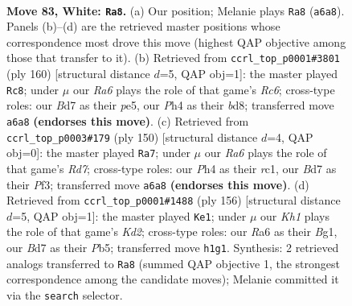 \documentclass[11pt]{article}
\begin{document}
\clearpage

\begin{figure}[p]\centering
\begin{subfigure}{0.46\textwidth}\centering
\resizebox{\linewidth}{!}{%
\newchessgame
\chessboard[
  setfen={8/3B1P2/R7/8/7P/1k6/8/7K w - - 9 83},
  showmover=false,
  pgfstyle=straightmove, color=movearrow, markmove={a6-a8}
]}
\caption{}
\end{subfigure}\hfill
\begin{subfigure}{0.46\textwidth}\centering
\resizebox{\linewidth}{!}{%
\newchessgame
\chessboard[
  setfen={3b4/5k2/2R5/4p3/6P1/8/5K2/8 w - - 21 81},
  showmover=false,
  pgfstyle=straightmove, color=movearrow, markmove={c6-c8}
]}
\caption{}
\end{subfigure}
\\[4pt]
\begin{subfigure}{0.46\textwidth}\centering
\resizebox{\linewidth}{!}{%
\newchessgame
\chessboard[
  setfen={8/3R4/6k1/8/7P/5P2/7K/2r5 w - - 7 76},
  showmover=false,
  pgfstyle=straightmove, color=movearrow, markmove={d7-a7}
]}
\caption{}
\end{subfigure}\hfill
\begin{subfigure}{0.46\textwidth}\centering
\resizebox{\linewidth}{!}{%
\newchessgame
\chessboard[
  setfen={8/8/5p2/1P1k3b/8/8/3K4/6B1 w - - 1 79},
  showmover=false,
  pgfstyle=straightmove, color=movearrow, markmove={d2-e1}
]}
\caption{}
\end{subfigure}
\caption{\textbf{Move 83, White: \texttt{Ra8}.} (a) Our position; Melanie plays \texttt{Ra8} (\texttt{a6a8}). Panels (b)--(d) are the retrieved master positions whose correspondence most drove this move (highest QAP objective among those that transfer to it). (b) Retrieved from \texttt{ccrl\_top\_p0001\#3801} (ply 160) [structural distance $d$=5, QAP obj=1]: the master played \texttt{Rc8}; under $\mu$ our \emph{Ra6} plays the role of that game's \emph{Rc6}; cross-type roles: our \emph{B}d7 as their \emph{p}e5, our \emph{P}h4 as their \emph{b}d8; transferred move \texttt{a6a8} \textbf{(endorses this move)}. (c) Retrieved from \texttt{ccrl\_top\_p0003\#179} (ply 150) [structural distance $d$=4, QAP obj=0]: the master played \texttt{Ra7}; under $\mu$ our \emph{Ra6} plays the role of that game's \emph{Rd7}; cross-type roles: our \emph{P}h4 as their \emph{r}c1, our \emph{B}d7 as their \emph{P}f3; transferred move \texttt{a6a8} \textbf{(endorses this move)}. (d) Retrieved from \texttt{ccrl\_top\_p0001\#1488} (ply 156) [structural distance $d$=5, QAP obj=1]: the master played \texttt{Ke1}; under $\mu$ our \emph{Kh1} plays the role of that game's \emph{Kd2}; cross-type roles: our \emph{R}a6 as their \emph{B}g1, our \emph{B}d7 as their \emph{P}b5; transferred move \texttt{h1g1}. Synthesis: 2 retrieved analogs transferred to \texttt{Ra8} (summed QAP objective 1, the strongest correspondence among the candidate moves); Melanie committed it via the \texttt{search} selector.}
\label{fig:thought-m164}
\end{figure}
\end{document}
